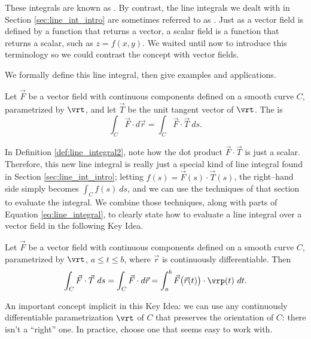 These integrals are known as . By contrast, the line integrals we dealt with in Section \ref{sec:line_int_intro} are sometimes referred to as . Just as a vector field is defined by a function that returns a vector, a scalar field is a function that returns a scalar, such as $z = f(x,y)$. We waited until now to introduce this terminology so we could contrast the concept with vector fields. 

We formally define this line integral, then give examples and applications.

{Let $\vec F$ be a vector field with continuous components defined on a smooth curve $C$, parametrized by $\vrt$, and let $\vec T$ be the unit tangent vector of $\vrt$. The  is
\[
\int_C \vec F\cdot d\vec r = \int_C \vec F\cdot\vec T\ ds.
\]
}

In Definition \ref{def:line_integral2}, note how the dot product $\vec F \cdot \vec T$ is just a scalar. %
Therefore, this new line integral is really just a special kind of line integral found in Section \ref{sec:line_int_intro}; letting $f(s) = \vec F(s)\cdot \vec T(s)$, the right--hand side simply becomes $\int_C f(s)\ ds$, and we can use the techniques of that section to evaluate the integral. We combine those techniques, along with parts of Equation \eqref{eq:line_integral}, to clearly state how to evaluate a line integral over a vector field in the following Key Idea. 

{Let $\vec F$ be a vector field with continuous components defined on a smooth curve $C$, parametrized by $\vrt$, $a\leq t\leq b$, where $\vec r$ is continuously differentiable. Then
	\[
	\int_C\vec F\cdot\vec T\ ds = \int_C \vec F\cdot d\vec r =\int_a^b \vec F\big(\vec r(t)\big) \cdot \vrp(t)\ dt.
	\]
}

An important concept implicit in this Key Idea: we can use any continuously differentiable parametrization $\vrt$ of $C$ that preserves the orientation of $C$: there isn't a ``right'' one. In practice, choose one that seems easy to work with. 

